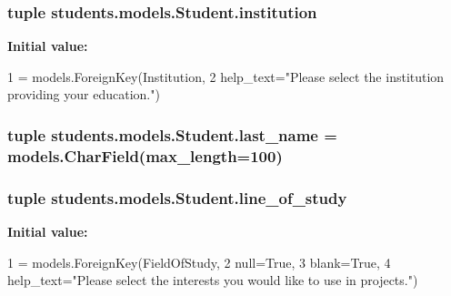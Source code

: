 \hypertarget{classstudents_1_1models_1_1_student_a41718377a531d1677d8196ac292ccb43}{
\subsubsection[{institution}]{\setlength{\rightskip}{0pt plus 5cm}tuple students.\-models.\-Student.\-institution\hspace{0.3cm}{\ttfamily [static]}}}\label{classstudents_1_1models_1_1_student_a41718377a531d1677d8196ac292ccb43}
{\bfseries Initial value\-:}
\begin{DoxyCode}
1 = models.ForeignKey(Institution,
2                                     help\_text=\textcolor{stringliteral}{"Please select the institution providing your education."})
\end{DoxyCode}
\hypertarget{classstudents_1_1models_1_1_student_a851aa51a430028eb921054a10e79a599}{
\subsubsection[{last\-\_\-name}]{\setlength{\rightskip}{0pt plus 5cm}tuple students.\-models.\-Student.\-last\-\_\-name = models.\-Char\-Field(max\-\_\-length=100)\hspace{0.3cm}{\ttfamily [static]}}}\label{classstudents_1_1models_1_1_student_a851aa51a430028eb921054a10e79a599}
\hypertarget{classstudents_1_1models_1_1_student_af95758393c5324d289f2b24441222b32}{
\subsubsection[{line\-\_\-of\-\_\-study}]{\setlength{\rightskip}{0pt plus 5cm}tuple students.\-models.\-Student.\-line\-\_\-of\-\_\-study\hspace{0.3cm}{\ttfamily [static]}}}\label{classstudents_1_1models_1_1_student_af95758393c5324d289f2b24441222b32}
{\bfseries Initial value\-:}
\begin{DoxyCode}
1 = models.ForeignKey(FieldOfStudy,
2                                            null=\textcolor{keyword}{True},
3                                            blank=\textcolor{keyword}{True},
4                                            help\_text=\textcolor{stringliteral}{"Please select the interests you would like to use in
       projects."})
\end{DoxyCode}
